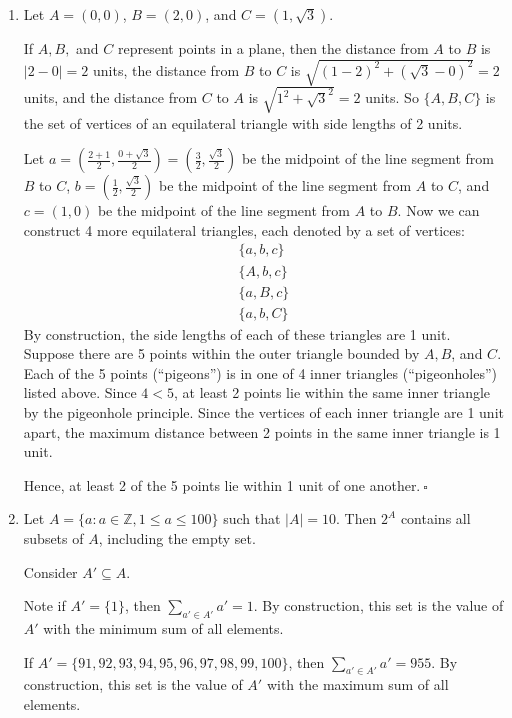 \documentclass{article}
\newcommand{\Z}{\mathbb{Z}}
\theoremstyle{definition}
\begin{document}
\begin{solution}
\begin{enumerate}
\item Let $A=(0,0)$, $B=(2,0)$, and $C=(1,\sqrt{3})$.

\noindent If $A,B,$ and $C$ represent points in a plane, then the distance from $A$ to $B$ is $|2-0|=2$ units, the distance from $B$ to $C$ is $\sqrt{(1-2)^2+(\sqrt{3}-0)^2}=2$ units, and the distance from $C$ to $A$ is $\sqrt{1^2+\sqrt{3}^2}=2$ units. So $\{A,B,C\}$ is the set of vertices of an equilateral triangle with side lengths of 2 units.

\noindent Let $a=\left(\frac{2+1}{2},\frac{0+\sqrt{3}}{2}\right)=\left(\frac{3}{2},\frac{\sqrt{3}}{2}\right)$ be the midpoint of the line segment from $B$ to $C$, $b=\left(\frac{1}{2},\frac{\sqrt{3}}{2}\right)$ be the midpoint of the line segment from $A$ to $C$, and $c=\left(1,0\right)$ be the midpoint of the line segment from $A$ to $B$. Now we can construct 4 more equilateral triangles, each denoted by a set of vertices:
\begin{align}
\{a,b,c\}\\
\{A,b,c\}\\
\{a,B,c\}\\
\{a,b,C\}
\end{align}
By construction, the side lengths of each of these triangles are 1 unit. Suppose there are 5 points within the outer triangle bounded by $A,B$, and $C$. Each of the 5 points (``pigeons'') is in one of 4 inner triangles (``pigeonholes'') listed above. Since $4<5$, at least 2 points lie within the same inner triangle by the pigeonhole principle. Since the vertices of each inner triangle are 1 unit apart, the maximum distance between 2 points in the same inner triangle is 1 unit.

\noindent Hence, at least 2 of the 5 points lie within 1 unit of one another.$~\square$
\item Let $A=\{a:a\in\Z,1\leq a\leq 100\}$ such that $|A|=10$. Then $2^A$ contains all subsets of $A$, including the empty set.

Consider $A'\subseteq A$.

Note if $A'=\{1\}$, then $\sum_{a'\in A'}{a'}=1$. By construction, this set is the value of $A'$ with the minimum sum of all elements.

If $A'=\{91,92,93,94,95,96,97,98,99,100\}$, then $\sum_{a'\in A'}{a'}=955$. By construction, this set is the value of $A'$ with the maximum sum of all elements.


\end{enumerate}
\end{solution}
\end{document}
